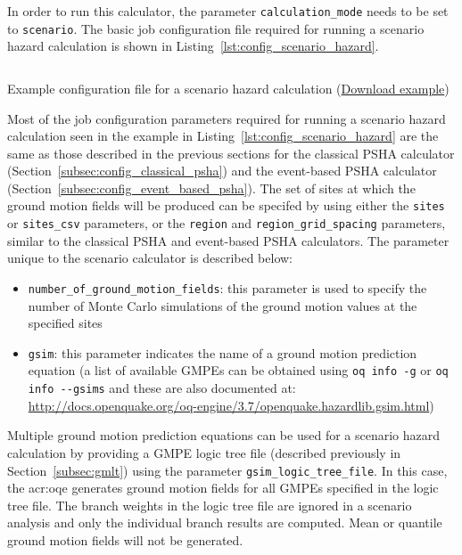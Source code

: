 In order to run this calculator, the parameter \Verb+calculation_mode+ needs
to be set to \Verb+scenario+. The basic job configuration file required for
running a scenario hazard calculation is shown in
Listing~\ref{lst:config_scenario_hazard}.

\begin{listing}[htbp]
  \inputminted[firstline=1,firstnumber=1,fontsize=\footnotesize,frame=single,linenos,bgcolor=lightgray,label=job.ini]{ini}{oqum/hazard/verbatim/config_scenario.ini}
  \caption{Example configuration file for a scenario hazard calculation (\href{https://raw.githubusercontent.com/gem/oq-engine/master/oqum/hazard/verbatim/config_scenario.ini}{Download example})}
  \label{lst:config_scenario_hazard}
\end{listing}

Most of the job configuration parameters required for running a scenario
hazard calculation seen in the example in
Listing~\ref{lst:config_scenario_hazard} are the same as those described in
the previous sections for the classical PSHA calculator
(Section~\ref{subsec:config_classical_psha}) and the event-based PSHA
calculator (Section~\ref{subsec:config_event_based_psha}). The set of sites at
which the ground motion fields will be produced can be specifed by using
either the \Verb+sites+ or \Verb+sites_csv+ parameters, or the \Verb+region+
and \Verb+region_grid_spacing+  parameters, similar to the classical PSHA and
event-based PSHA calculators. The parameter unique to the scenario calculator
is described below:

\begin{itemize}

  \item \Verb+number_of_ground_motion_fields+: this parameter is used to
    specify the number of Monte Carlo simulations of the ground motion
    values at the specified sites

  \item \Verb+gsim+: this parameter indicates the name of a ground motion
  prediction equation (a list of available GMPEs can be obtained using
  \texttt{oq info -g} or \texttt{oq info -{}-gsims} and these are also
  documented at: \href{http://docs.openquake.org/oq-engine/3.7/openquake.hazardlib.gsim.html}{http://docs.openquake.org/oq-engine/3.7/openquake.hazardlib.gsim.html})

\end{itemize}

Multiple ground motion prediction equations can be used for a scenario hazard
calculation by providing a GMPE logic tree file (described previously in 
Section~\ref{subsec:gmlt}) using the parameter \Verb+gsim_logic_tree_file+.
In this case, the \glsdesc{acr:oqe} generates ground motion fields
for all GMPEs specified in the logic tree file. The branch weights in the logic
tree file are ignored in a scenario analysis and only the individual branch
results are computed. Mean or quantile ground motion fields will not be 
generated.

